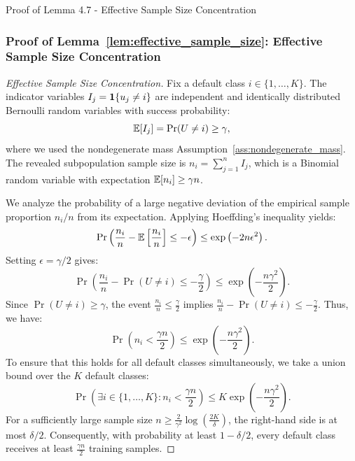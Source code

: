 \begin{sourceblock}{Proof of Lemma 4.7 - Effective Sample Size Concentration}
\subsubsection*{Proof of Lemma~\ref{lem:effective_sample_size}: Effective Sample Size Concentration}
\label{app:proof_effective_sample_size}
\begin{proof}[Effective Sample Size Concentration]
Fix a default class $i \in \{1, \dots, K\}$. The indicator variables $I_j = \mathbf{1}\{u_j \ne i\}$ are independent and identically distributed Bernoulli random variables with success probability:
\begin{equation}
    \mathbb{E}[I_j] = \Pr(U \ne i) \ge \gamma,
\end{equation}
where we used the nondegenerate mass Assumption~\ref{ass:nondegenerate_mass}.
The revealed subpopulation sample size is $n_i = \sum_{j=1}^n I_j$, which is a Binomial random variable with expectation $\mathbb{E}[n_i] \ge \gamma n$.

We analyze the probability of a large negative deviation of the empirical sample proportion $n_i/n$ from its expectation. Applying Hoeffding's inequality yields:
\begin{equation}
    \Pr\left( \frac{n_i}{n} - \mathbb{E}\left[ \frac{n_i}{n} \right] \le - \epsilon \right) \le \exp\left( -2n \epsilon^2 \right).
\end{equation}
Setting $\epsilon = \gamma/2$ gives:
\begin{equation}
    \Pr\left( \frac{n_i}{n} - \Pr(U \ne i) \le - \frac{\gamma}{2} \right) \le \exp\left( - \frac{n \gamma^2}{2} \right).
\end{equation}
Since $\Pr(U \ne i) \ge \gamma$, the event $\frac{n_i}{n} \le \frac{\gamma}{2}$ implies $\frac{n_i}{n} - \Pr(U \ne i) \le - \frac{\gamma}{2}$. Thus, we have:
\begin{equation}
    \Pr\left( n_i < \frac{\gamma n}{2} \right) \le \exp\left( - \frac{n \gamma^2}{2} \right).
\end{equation}
To ensure that this holds for all default classes simultaneously, we take a union bound over the $K$ default classes:
\begin{equation}
    \Pr\left( \exists i \in \{1, \dots, K\} : n_i < \frac{\gamma n}{2} \right) \le K \exp\left( - \frac{n \gamma^2}{2} \right).
\end{equation}
For a sufficiently large sample size $n \ge \frac{2}{\gamma^2}\log\left(\frac{2K}{\delta}\right)$, the right-hand side is at most $\delta/2$. Consequently, with probability at least $1 - \delta/2$, every default class receives at least $\frac{\gamma n}{2}$ training samples.
\end{proof}
\end{sourceblock}

